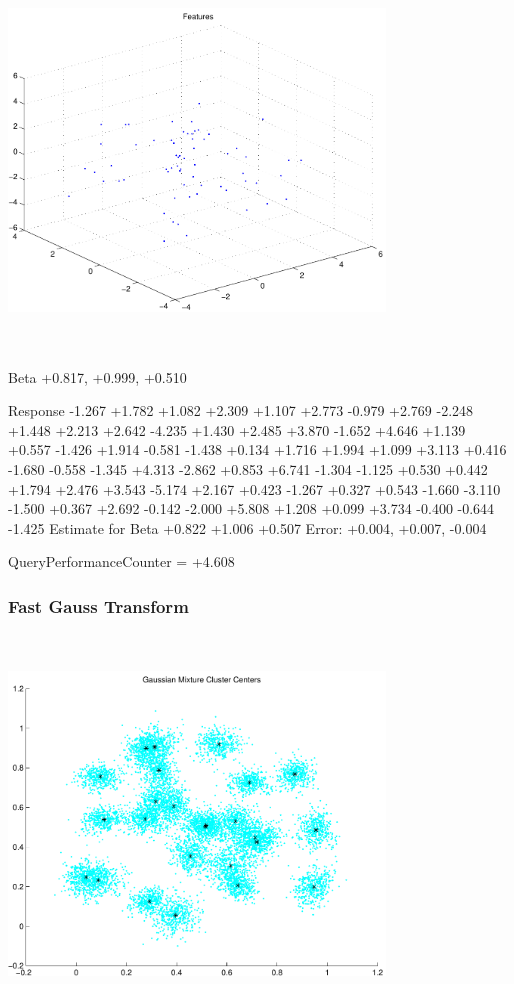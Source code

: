 \documentclass[9pt]{article}
\theoremstyle{plain}
\theoremstyle{definition}
\theoremstyle{remark}
\numberwithin{equation}{section}
\begin{document}
\includegraphics[width=10.0cm,height=10.0cm]{regression_features.pdf}

Beta
+0.817, +0.999, +0.510

Response
-1.267
+1.782
+1.082
+2.309
+1.107
+2.773
-0.979
+2.769
-2.248
+1.448
+2.213
+2.642
-4.235
+1.430
+2.485
+3.870
-1.652
+4.646
+1.139
+0.557
-1.426
+1.914
-0.581
-1.438
+0.134
+1.716
+1.994
+1.099
+3.113
+0.416
-1.680
-0.558
-1.345
+4.313
-2.862
+0.853
+6.741
-1.304
-1.125
+0.530
+0.442
+1.794
+2.476
+3.543
-5.174
+2.167
+0.423
-1.267
+0.327
+0.543
-1.660
-3.110
-1.500
+0.367
+2.692
-0.142
-2.000
+5.808
+1.208
+0.099
+3.734
-0.400
-0.644
-1.425
Estimate for Beta
+0.822
+1.006
+0.507
Error:
+0.004, +0.007, -0.004


QueryPerformanceCounter  =  +4.608
\subsubsection{Fast Gauss Transform}
\includegraphics[width=10.0cm,height=10.0cm]{GaussianMixture_ClusterCenters25_Centers.pdf}
\end{document}
